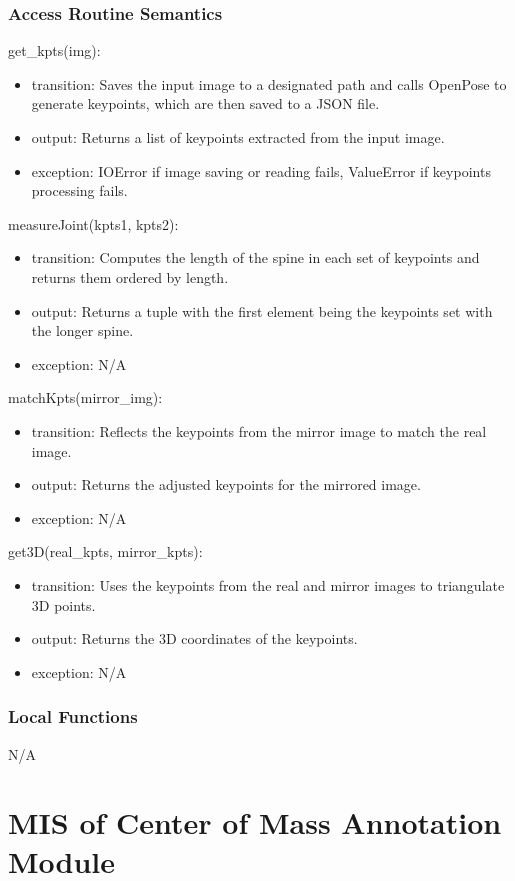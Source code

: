 \documentclass[12pt, titlepage]{article}
\begin{document}
\subsubsection{Access Routine Semantics}
\noindent get\_kpts(img):
\begin{itemize}
\item transition: Saves the input image to a designated path and calls OpenPose to
  generate keypoints, which are then saved to a JSON file.
\item output: Returns a list of keypoints extracted from the input image.
\item exception: IOError if image saving or reading fails, ValueError if keypoints
  processing fails.
\end{itemize}

\noindent measureJoint(kpts1, kpts2):
\begin{itemize}
\item transition: Computes the length of the spine in each set of keypoints and
  returns them ordered by length.
\item output: Returns a tuple with the first element being the keypoints set with
  the longer spine.
\item exception: N/A
\end{itemize}

\noindent matchKpts(mirror\_img):
\begin{itemize}
\item transition: Reflects the keypoints from the mirror image to match the real
  image.
\item output: Returns the adjusted keypoints for the mirrored image.
\item exception: N/A
\end{itemize}

\noindent get3D(real\_kpts, mirror\_kpts):
\begin{itemize}
\item transition: Uses the keypoints from the real and mirror images to triangulate
  3D points.
\item output: Returns the 3D coordinates of the keypoints.
\item exception: N/A
\end{itemize}

\subsubsection{Local Functions}
N/A

\section{MIS of Center of Mass Annotation Module} \label{sec:centerofmass}
\end{document}
